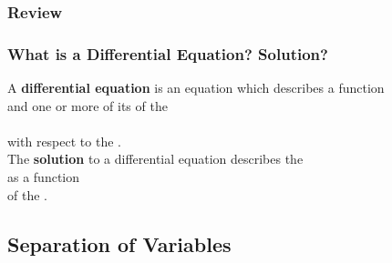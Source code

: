 \documentclass[fleqn]{beamer} %
\newcommand{\sectionIIsubsectionItitle}{Review}
\newcommand{\sectionIIsubsectionIItitle}{Separation of Variables}
\begin{document}
			\begin{frame}[label=sectionIIsubsectionI]
				\frametitle{\sectionIIsubsectionItitle}
				\bigskip

				  \frametitle{What is a Differential Equation? Solution?}

A {\bf differential equation} is an equation which describes a function \vspace{3mm}\\and one or more of its \underline{\hspace{50mm}} of the \vspace{3mm}\\ \underline{\hspace{50mm}}\hspace{3mm}\underline{\hspace{50mm}}\vspace{2mm}\\ with respect to the \underline{\hspace{60mm}}. \vspace{8mm} \\
 
The {\bf solution} to a differential equation describes the \vspace{2mm}\\ \underline{\hspace{40mm}}\hspace{2mm}\underline{\hspace{40mm}} as a function \vspace{2mm}\\of the \underline{\hspace{40mm}}\hspace{2mm}\underline{\hspace{40mm}}.  \vspace{5mm}\\
				
				
				\btVFill
			\end{frame}


		\subsection{\sectionIIsubsectionIItitle}\label{sectionIIsubsectionII}

		
\end{document}
